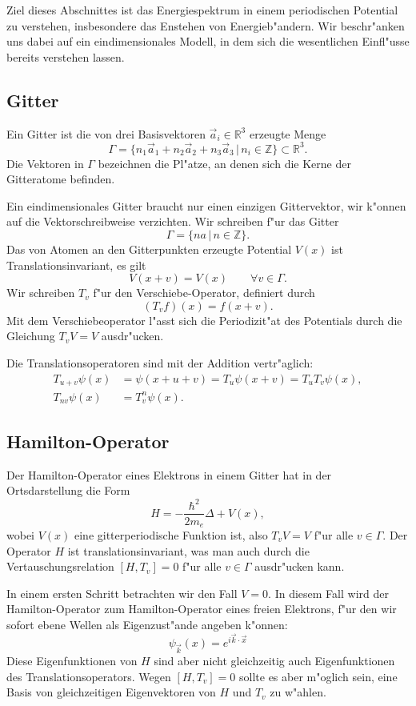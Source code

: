 Ziel dieses Abschnittes ist das Energiespektrum in einem periodischen
Potential zu verstehen, insbesondere das Enstehen von Energieb"andern.
Wir beschr"anken uns dabei auf ein eindimensionales Modell, in dem sich die
wesentlichen Einfl"usse bereits verstehen lassen.

\subsection{Gitter}
Ein Gitter ist die von drei Basisvektoren $\vec a_i\in\mathbb R^3$
erzeugte Menge
\[
\Gamma
=
\{
n_1\vec a_1+
n_2\vec a_2+
n_3\vec a_3
\,|\,
n_i\in \mathbb Z
\}\subset{\mathbb R}^3.
\]
Die Vektoren in $\Gamma$ bezeichnen die Pl"atze, an denen sich die
Kerne der Gitteratome befinden. 

Ein eindimensionales Gitter braucht nur einen einzigen Gittervektor,
wir k"onnen auf die Vektorschreibweise verzichten.
Wir schreiben f"ur das Gitter
\[
\Gamma=\{ na\,|\,n\in\mathbb Z\}.
\]
Das von Atomen an den Gitterpunkten erzeugte Potential $V(x)$
ist Translationsinvariant, es gilt
\[
V(x+v)=V(x)\qquad\forall v\in\Gamma.
\]
Wir schreiben $T_v$ f"ur den Verschiebe-Operator, definiert durch
\[
(T_vf)(x)=f(x+v).
\]
Mit dem Verschiebeoperator l"asst sich die Periodizit"at des Potentials
durch die Gleichung $T_vV=V$ ausdr"ucken.

Die Translationsoperatoren sind mit der Addition vertr"aglich:
\begin{align*}
T_{u+v}\psi(x)&=\psi(x+u+v)=T_u\psi(x+v)=T_uT_v\psi(x),\\
T_{nv}\psi(x)&=T_v^n\psi(x).
\end{align*}

\subsection{Hamilton-Operator}
Der Hamilton-Operator eines Elektrons in einem Gitter hat in der Ortsdarstellung
die Form
\[
H=-\frac{\hbar^2}{2m_e}\Delta + V(x),
\]
wobei $V(x)$ eine gitterperiodische Funktion ist, also $T_vV=V$ f"ur alle
$v\in\Gamma$.
Der Operator $H$ ist translationsinvariant, was man auch durch
die Vertauschungsrelation $[H,T_v]=0$ f"ur alle $v\in\Gamma$
ausdr"ucken kann.

In einem ersten Schritt betrachten wir den Fall $V=0$.
In diesem Fall wird der Hamilton-Operator zum Hamilton-Operator eines
freien Elektrons, f"ur den wir sofort ebene Wellen als Eigenzust"ande
angeben k"onnen:
\begin{equation}
\psi_{\vec k}(x)=e^{i\vec k\cdot \vec x}
\label{skript:ebenewelle}
\end{equation}
Diese Eigenfunktionen von $H$ sind aber nicht gleichzeitig auch
Eigenfunktionen des Translationsoperators. Wegen $[H,T_v]=0$
sollte es aber m"oglich sein, eine Basis von gleichzeitigen
Eigenvektoren von $H$ und $T_v$ zu w"ahlen.


